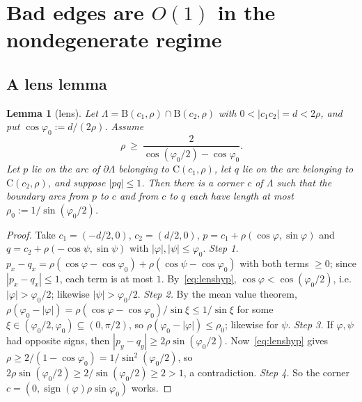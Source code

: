 \documentclass[11pt]{amsart}
\newtheorem{lemma}[theorem]{Lemma}
\theoremstyle{definition}
\theoremstyle{remark}
\newcommand{\Cc}{\mathrm{C}}      %
\newcommand{\Dd}{\mathrm{B}}      %
\begin{document}
\section{Bad edges are \texorpdfstring{$O(1)$}{O(1)} in the nondegenerate regime}\label{sec:bad}

\subsection{A lens lemma}

\begin{lemma}[lens]\label{lem:lens}
Let $\Lambda=\Dd(c_1,\rho)\cap\Dd(c_2,\rho)$ with $0<|c_1c_2|=d<2\rho$, and put $\cos\varphi_0:=d/(2\rho)$. Assume
\begin{equation}\label{eq:lenshyp}
\rho\ \ge\ \frac{2}{\cos(\varphi_0/2)-\cos\varphi_0}.
\end{equation}
Let $p$ lie on the arc of $\partial\Lambda$ belonging to $\Cc(c_1,\rho)$, let $q$ lie on the arc belonging to $\Cc(c_2,\rho)$, and suppose $|pq|\le 1$. Then there is a corner $c$ of $\Lambda$ such that the boundary arcs from $p$ to $c$ and from $c$ to $q$ each have length at most $\rho_0:=1/\sin(\varphi_0/2)$.
\end{lemma}
\begin{proof}
Take $c_1=(-d/2,0)$, $c_2=(d/2,0)$, $p=c_1+\rho(\cos\varphi,\sin\varphi)$ and $q=c_2+\rho(-\cos\psi,\sin\psi)$ with $|\varphi|,|\psi|\le\varphi_0$.
\emph{Step 1.} $p_x-q_x=\rho(\cos\varphi-\cos\varphi_0)+\rho(\cos\psi-\cos\varphi_0)$ with both terms $\ge0$; since $|p_x-q_x|\le1$, each term is at most $1$. By~\eqref{eq:lenshyp}, $\cos\varphi<\cos(\varphi_0/2)$, i.e.\ $|\varphi|>\varphi_0/2$; likewise $|\psi|>\varphi_0/2$.
\emph{Step 2.} By the mean value theorem, $\rho(\varphi_0-|\varphi|)=\rho(\cos\varphi-\cos\varphi_0)/\sin\xi\le 1/\sin\xi$ for some $\xi\in(\varphi_0/2,\varphi_0)\subseteq(0,\pi/2)$, so $\rho(\varphi_0-|\varphi|)\le\rho_0$; likewise for $\psi$.
\emph{Step 3.} If $\varphi,\psi$ had opposite signs, then $|p_y-q_y|\ge 2\rho\sin(\varphi_0/2)$. Now~\eqref{eq:lenshyp} gives $\rho\ge 2/(1-\cos\varphi_0)=1/\sin^2(\varphi_0/2)$, so $2\rho\sin(\varphi_0/2)\ge 2/\sin(\varphi_0/2)\ge2>1$, a contradiction.
\emph{Step 4.} So the corner $c=(0,\operatorname{sign}(\varphi)\rho\sin\varphi_0)$ works.
\end{proof}
\end{document}
